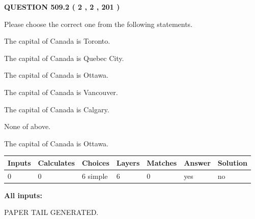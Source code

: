 \documentclass[12pt]{article}
\begin{document}
\vspace{0.2in}
  
{\textbf{\Large{QUESTION
509.2 
 ( 2 , 2 , 201 )
}}}
  
  
Please choose the correct one from the following statements.
 
 
The capital of Canada is Toronto.
 
 
The capital of Canada is Quebec City.
 
 
The capital of Canada is Ottawa.
 
 
The capital of Canada is Vancouver.
 
 
The capital of Canada is Calgary.
 
 
 None of above.
 
 
\noindent{}
 
 
The capital of Canada is Ottawa.
 
 
\noindent{}
 
 
   
   
   
   
\noindent\begin{tabular}{|l|l|l|l|l|l|l|}
 \hline
Inputs & Calculates & Choices & Layers & Matches & Answer & Solution \\ \hline
 0  & 
 0  & 
 6
  simple  
  & 
 6  & 
 0  & 
  yes & 
  no 
  \\ \hline
 \end{tabular}
   
   
   
   
\noindent{}
   
   
   
   
\noindent\vspace{0.1in}\hspace{-0.08in} {\textbf{\Large{All inputs: }}}
   
   
   
   
   
   
 \vspace{0.2in}
 
   
   
\vspace{2.0in} PAPER TAIL GENERATED.
   
\end{document}
